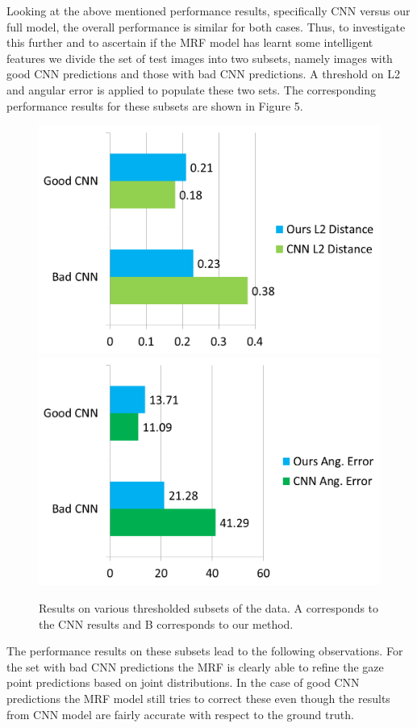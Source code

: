 \documentclass[10pt,twocolumn,letterpaper]{article}
\begin{document}
\vspace{3ex}
Looking at the above mentioned performance results, specifically CNN versus our full model, the overall performance is similar for both cases. Thus, to investigate this further and to ascertain if the MRF model has learnt some intelligent features we divide the set of test images into two subsets, namely images with good CNN predictions and those with bad CNN predictions. A threshold on L2 and angular error is applied to populate these two sets. The corresponding performance results for these subsets are shown in Figure 5.

\begin{figure}[H]
  \begin{center}
    \includegraphics[width=0.70\linewidth]{images/graph5.png} \\
    \includegraphics[width=0.70\linewidth]{images/graph6.png}
  \end{center}
  \vspace{-0.3cm}
   \caption{Results on various thresholded subsets of the data. A corresponds to the CNN results and B corresponds to our method.}
  \vspace{-0.5cm}
\end{figure}
\vspace{3ex}
The performance results on these subsets lead to the following observations. For the set with bad CNN predictions the MRF is clearly able to refine the gaze point predictions based on joint distributions.  In the case of good CNN predictions the MRF model still tries to correct these even though the results from CNN model are fairly accurate with respect to the ground truth.
\end{document}
